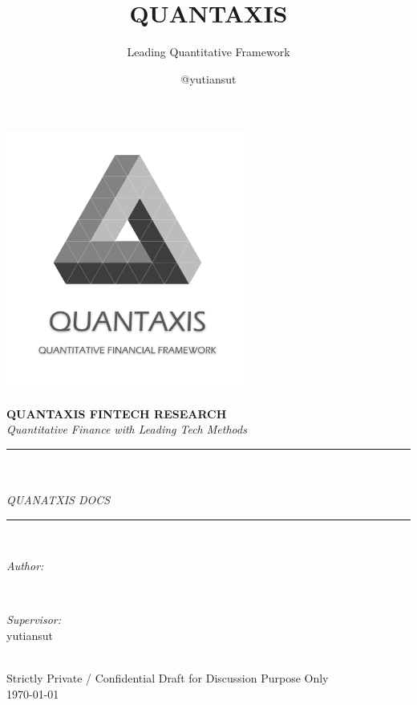 \documentclass{scrartcl}
\numberwithin{equation}{section}   %
\begin{document}
\title{QUANTAXIS}%
\subtitle{Leading Quantitative Framework}
\author{@yutiansut}
\begin{titlepage}
    \newcommand{\HRule}{\rule{\linewidth}{0.5mm}}
    \includegraphics[width=8cm]{qalogo.png}\\[1cm]
    \center
    \quad\\[1.5cm]
    \textbf{\Large  QUANTAXIS FINTECH RESEARCH }\\[0.5cm]
    \textsl{\large Quantitative Finance with Leading Tech Methods}\\[0.5cm]

    \makeatletter
    \HRule \\[0.4cm]
    { \huge \bfseries \@title}\\[0.4cm]
    \textsl{\large QUANATXIS DOCS}\\[0.5cm]
    \HRule \\[1.5cm]
    \begin{minipage}{0.4\textwidth}
        \begin{flushleft} \large
            \emph{Author:}\\
            \@author
        \end{flushleft}
    \end{minipage}
    ~
    \begin{minipage}{0.4\textwidth}
        \begin{flushright} \large
            \emph{Supervisor:} \\
            \textup{yutiansut}
        \end{flushright}
    \end{minipage}\\[2cm]
    \makeatother
    {\large Strictly Private / Confidential Draft for Discussion Purpose Only}\\[0.5cm]
    {\large \today}\\[1cm]
    \vfill
\end{titlepage}
\end{document}
